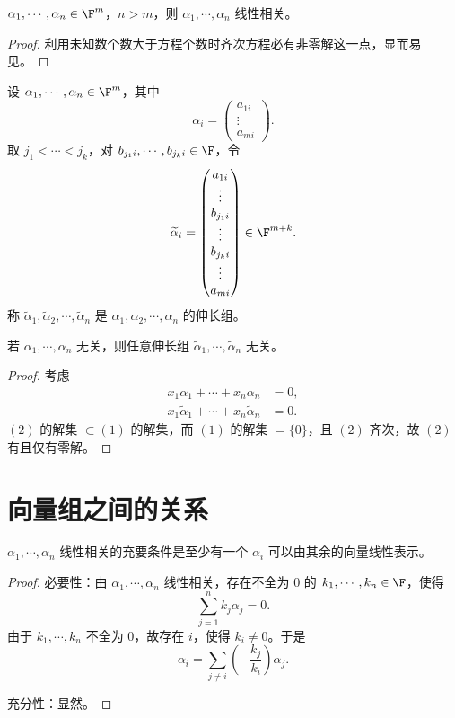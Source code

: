 \begin{proposition}\label{2.2.7}
	$\alpha_1,\cdots,\alpha_n\in\F^m$，$n>m$，则 $\alpha_1,\cdots,\alpha_n$ 线性相关。
\end{proposition}
\begin{proof}
	利用未知数个数大于方程个数时齐次方程必有非零解这一点，显而易见。
\end{proof}

\begin{definition}\label{p1:concept:c2-l383}
	设 $\alpha_1,\cdots,\alpha_n\in\F^m$，其中
	\[
	\alpha_i=
	\begin{pmatrix}
		a_{1i}\\
		\vdots\\
		a_{mi}
	\end{pmatrix}.
	\]
	取 $j_1<\cdots<j_k$，对 $b_{j_1 i},\cdots,b_{j_k i}\in\F$，令
	\[
	\widetilde{\alpha}_i=
	\begin{pmatrix}
		a_{1i}\\
		\vdots\\
		b_{j_1 i}\\
		\vdots\\
		b_{j_k i}\\
		\vdots\\
		a_{mi}
	\end{pmatrix}\in\F^{m+k}.
	\]
	称 $\widetilde{\alpha}_1,\widetilde{\alpha}_2,\cdots,\widetilde{\alpha}_n$ 是 $\alpha_1,\alpha_2,\cdots,\alpha_n$ 的伸长组。
\end{definition}

\begin{proposition}
	若 $\alpha_1,\cdots,\alpha_n$ 无关，则任意伸长组 $\widetilde{\alpha}_1,\cdots,\widetilde{\alpha}_n$ 无关。
\end{proposition}
\begin{proof}
	考虑
	\begin{align}
		x_1\alpha_1+\cdots+x_n\alpha_n&=0,\tag{1}\\
		x_1\widetilde{\alpha}_1+\cdots+x_n\widetilde{\alpha}_n&=0.\tag{2}
	\end{align}
	$(2)$ 的解集 $\subset (1)$ 的解集，而 $(1)$ 的解集 $=\{0\}$，且 $(2)$ 齐次，故 $(2)$ 有且仅有零解。
\end{proof}

\section{向量组之间的关系}

\begin{lemma}
	$\alpha_1,\cdots,\alpha_n$ 线性相关的充要条件是至少有一个 $\alpha_i$ 可以由其余的向量线性表示。
\end{lemma}
\begin{proof}
	必要性：由 $\alpha_1,\cdots,\alpha_n$ 线性相关，存在不全为 $0$ 的
	$k_1,\cdots,k_n\in\F$，使得
	\[
	\sum_{j=1}^n k_j\alpha_j=0.
	\]
	由于 $k_1,\cdots,k_n$ 不全为 $0$，故存在 $i$，使得 $k_i\neq0$。于是
	\[
	\alpha_i=\sum_{j\neq i}\left(-\frac{k_j}{k_i}\right)\alpha_j.
	\]

	充分性：显然。
\end{proof}


